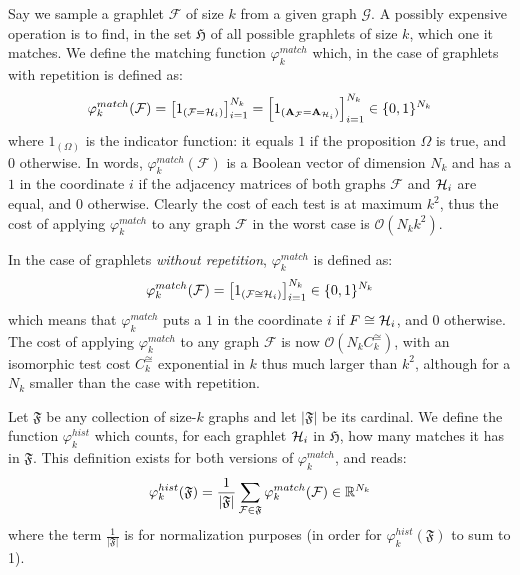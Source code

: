 Say we sample a graphlet $\mathcal{F}$ of size $k$ from a given graph $\mathcal{G}$. A possibly expensive operation is to find, in the set $\mathfrak{H}$ of all possible graphlets of size $k$, which one it matches. We define the matching function $\varphi_{k}^{match}$ which, in the case of graphlets with repetition is defined as: 
\[
\varphi_k^{match}(\mathcal{F}) = \left[ 1_{(\mathcal{F} = \mathcal{H}_i)}\right]_{i=1}^{N_k}= \left[ 1_{(\mathbf{A}_\mathcal{F} = \mathbf{A}_{\mathcal{H}_i})}\right]_{i=1}^{N_k} \in \{0,1\}^{N_k}
\]
where $1_{(\Omega)}$ is the indicator function: it equals $1$ if the proposition $\Omega$ is true, and $0$ otherwise. 
In words, $\varphi_k^{match}(\mathcal{F})$ is a Boolean vector of dimension $N_k$ and has a $1$ in the coordinate $i$ if the adjacency matrices of both graphs $\mathcal{F}$ and $\mathcal{H}_i$ are equal, and $0$ otherwise. Clearly the cost of each test is at maximum $k^2$,  thus the cost of applying $\varphi^{match}_k$ to any graph  $\mathcal{F}$ in the worst case  is $\mathcal{O}(N_k k^2)$.

In the case of graphlets \emph{without repetition}, $\varphi_k^{match}$ is defined as:
\[
\varphi_k^{match}(\mathcal{F}) = \left[ 1_{(\mathcal{F} \cong \mathcal{H}_i)}\right]_{i=1}^{N_k} \in \{0,1\}^{N_k}
\]
which means that $\varphi_k^{match}$ puts a $1$ in the coordinate $i$ if $F\cong \mathcal{H}_i$, and $0$ otherwise. The cost of applying $\varphi^{match}_k$ to any graph $\mathcal{F}$ is now $\mathcal{O}(N_k C^{\cong}_k)$, with an isomorphic test cost $C^{\cong}_k$ exponential in $k$ thus much larger than $k^2$, although for a $N_k$ smaller than the case with repetition.  

Let $\mathfrak{F}$ be any collection of size-$k$ graphs and let $|\mathfrak{F}|$ be its cardinal. We define the function $\varphi_k^{hist}$ which counts, for each graphlet $\mathcal{H}_i$ in $\mathfrak{H}$, how many matches it has in $\mathfrak{F}$. This definition exists for both versions of $\varphi_k^{match}$, and reads:
\begin{align}
	\label{eq:def:phi_hist}
	\varphi_k^{hist}(\mathfrak{F})=\frac{1}{|\mathfrak{F}|}\sum_{\mathcal{F}\in\mathfrak{F}} \varphi_k^{match} (\mathcal{F}) \in \mathbb{R}^{N_k}
\end{align}
where the term $\frac{1}{|\mathfrak{F}|}$ is for normalization purposes (in order for  $\varphi_k^{hist}(\mathfrak{F})$ to sum to 1). %


